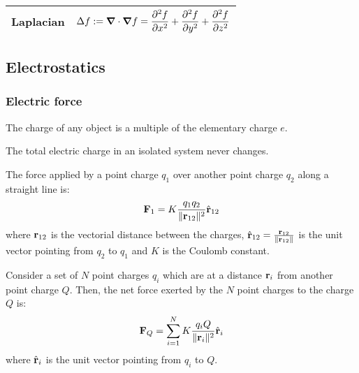 \documentclass[../../../main_physics.tex]{subfiles}
\begin{document}
\begin{center}
\begin{tabular}{|c|c|}
    \hline
    Laplacian  & $\displaystyle\Delta f:=\grad\cdot\grad f=\frac{\partial^2f}{\partial x^2}+\frac{\partial^2f}{\partial y^2}+\frac{\partial^2f}{\partial z^2}$                                                                                                                                                                              \\
    \hline
  \end{tabular}
\end{center}
\begin{multicols}{2}
  \subsection{Electrostatics}
  \subsubsection{Electric force}
  \begin{proposition}
    The charge of any object is a multiple of the elementary charge $e$.
  \end{proposition}
  \begin{law}
    The total electric charge in an isolated system never changes.
  \end{law}
  \begin{law}
    The force applied by a point charge $q_1$ over another point charge $q_2$ along a straight line is:
    $$\boldsymbol{\mathrm{F}}_1=K\frac{q_1q_2}{\|\boldsymbol{\mathrm{r}}_{12}\|^2}\hat{\boldsymbol{\mathrm{r}}}_{12}$$
    where $\boldsymbol{\mathrm{r}}_{12}$ is the vectorial distance between the charges, $\hat{\boldsymbol{\mathrm{r}}}_{12}=\frac{\boldsymbol{\mathrm{r}}_{12}}{\|\boldsymbol{\mathrm{r}}_{12}\|}$ is the unit vector pointing from $q_2$ to $q_1$ and $K$ is the Coulomb constant.
  \end{law}
  \begin{principle}
    Consider a set of $N$ point charges $q_i$ which are at a distance $\boldsymbol{\mathrm{r}}_i$ from another point charge $Q$. Then, the net force exerted by the $N$ point charges to the charge $Q$ is:
    $$\boldsymbol{\mathrm{F}}_Q=\sum_{i=1}^NK\frac{q_iQ}{\|\boldsymbol{\mathrm{r}}_{i}\|^2}\hat{\boldsymbol{\mathrm{r}}}_{i}$$ where $\hat{\boldsymbol{\mathrm{r}}}_{i}$ is the unit vector pointing from $q_i$ to $Q$.
  \end{principle}

\end{multicols}
\end{document}
